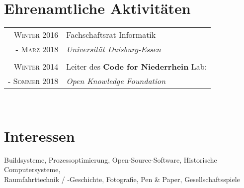 \documentclass[10pt,a4paper]{article}
\begin{document}
\section{Ehrenamtliche Aktivit\"aten}

\begin{tabular}{rl}
	\textsc{Winter} 2016		& Fachschaftsrat Informatik \\
	- \textsc{M\"arz} 2018	& \emph{Universit\"at Duisburg-Essen} \\
	& \\
	
	\textsc{Winter} 2014		& Leiter des \textbf{Code for Niederrhein} Lab: \\
	- \textsc{Sommer} 2018	& \emph{Open Knowledge Foundation} \\
\end{tabular} \\


\section{Interessen}
Buildsysteme, Prozessoptimierung, Open-Source-Software, Historische Computersysteme, \\
Raumfahrttechnik / -Geschichte, Fotografie, Pen \& Paper, Gesellschaftsspiele
\end{document}
